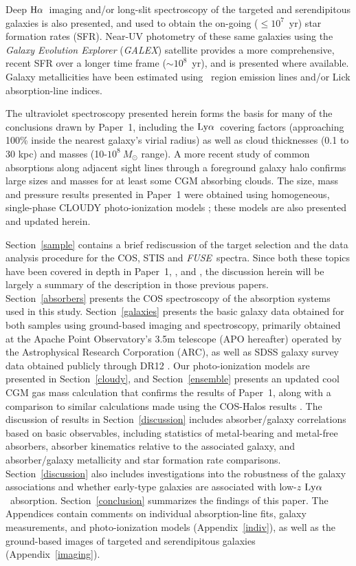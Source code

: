 \documentclass[twocolumn,twocolappendix,tighten,times]{aastex6}
\newcommand{\HII}{\ion{H}{2}}
\newcommand{\fuse}{{\sl FUSE}}
\newcommand{\galex}{{\sl GALEX}}
\newcommand{\Ha}{\ensuremath{{\rm H}\alpha}}
\newcommand{\lya}{\ensuremath{{\rm Ly}\alpha}}
\begin{document}
Deep \Ha\ imaging and/or long-slit spectroscopy of the targeted and serendipitous 
galaxies is also presented, and used to obtain the on-going ($\leq10^7$~yr) star 
formation rates (SFR). Near-UV photometry of these same galaxies using
the {\sl Galaxy Evolution Explorer} (\galex) satellite provides a more
comprehensive, recent SFR over a longer time frame ($\sim10^8$~yr), and is 
presented where available. Galaxy metallicities have been estimated using \HII\ 
region emission lines and/or Lick absorption-line indices.

The ultraviolet spectroscopy presented herein forms the basis 
for many of the conclusions drawn by Paper~1, including the
\lya\ covering factors (approaching 100\% inside the nearest galaxy's
virial radius) as well as cloud thicknesses (0.1 to 30 kpc) and masses
(10-$10^8~M_{\odot}$ range). A more recent study \citep{davis15} of common 
absorptions along adjacent sight lines through a foreground galaxy halo 
confirms large sizes and masses for at least some CGM absorbing clouds.
The size, mass and pressure results presented in Paper~1 were obtained using 
homogeneous, single-phase CLOUDY photo-ionization models \citep{ferland98}; 
these models are also presented and updated herein.

Section~\ref{sample} contains a brief rediscussion of the target
selection and the data analysis procedure for
the COS, STIS and \fuse\ spectra. Since both these topics have been
covered in depth in Paper~1, \citet{danforth16}, \citet{tilton12} and
\citet{keeney14}, the discussion herein will be largely a summary of
the description in those previous papers. Section~\ref{absorbers}
presents the COS spectroscopy of the absorption systems used in this
study. Section~\ref{galaxies} presents the basic galaxy data obtained
for both samples using ground-based imaging and spectroscopy,
primarily obtained at the Apache Point Observatory's 3.5m telescope
(APO hereafter) operated  by the Astrophysical Research Corporation
(ARC), as well as SDSS galaxy survey data obtained publicly through
DR12 \citep{alam15}. Our photo-ionization models are presented in 
Section~\ref{cloudy}, and Section~\ref{ensemble} presents an 
updated cool CGM gas mass calculation that conﬁrms the results of Paper~1, 
along with a comparison to similar calculations made using the COS-Halos 
results \citep{werk14,stern16,prochaska17}. The discussion of results in 
Section~\ref{discussion} includes absorber/galaxy correlations based on basic 
observables, including statistics of metal-bearing and metal-free absorbers, 
absorber kinematics relative to the associated galaxy, and absorber/galaxy 
metallicity and star formation rate comparisons. Section~\ref{discussion} 
also includes investigations into the robustness of the galaxy associations and 
whether early-type galaxies are associated with low-$z$ \lya\ absorption. 
Section~\ref{conclusion} summarizes the findings of this paper. The Appendices 
contain comments on individual absorption-line fits, galaxy measurements, and 
photo-ionization models (Appendix~\ref{indiv}), as well as the ground-based images 
of targeted and serendipitous galaxies (Appendix~\ref{imaging}).
\end{document}
